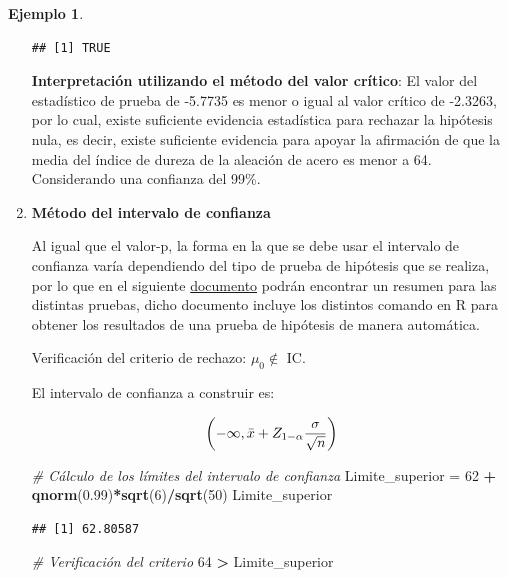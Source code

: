 \documentclass[
  11pt,
]{book}
\newenvironment{Shaded}{\begin{snugshade}}{\end{snugshade}}
\newcommand{\CommentTok}[1]{\textcolor[rgb]{0.56,0.35,0.01}{\textit{#1}}}
\newcommand{\DecValTok}[1]{\textcolor[rgb]{0.00,0.00,0.81}{#1}}
\newcommand{\FloatTok}[1]{\textcolor[rgb]{0.00,0.00,0.81}{#1}}
\newcommand{\FunctionTok}[1]{\textcolor[rgb]{0.13,0.29,0.53}{\textbf{#1}}}
\newcommand{\NormalTok}[1]{#1}
\newcommand{\OtherTok}[1]{\textcolor[rgb]{0.56,0.35,0.01}{#1}}
\newcommand{\SpecialCharTok}[1]{\textcolor[rgb]{0.81,0.36,0.00}{\textbf{#1}}}
\theoremstyle{definition}
\theoremstyle{definition}
\newtheorem{example}{Ejemplo}[chapter]
\theoremstyle{definition}
\theoremstyle{definition}
\theoremstyle{remark}
\begin{document}
\begin{example}
\begin{enumerate}
\begin{verbatim}
## [1] TRUE
\end{verbatim}

  \textbf{Interpretación utilizando el método del valor crítico}: El valor del estadístico de prueba de -5.7735 es menor o igual al valor crítico de -2.3263, por lo cual, existe suficiente evidencia estadística para rechazar la hipótesis nula, es decir, existe suficiente evidencia para apoyar la afirmación de que la media del índice de dureza de la aleación de acero es menor a 64. Considerando una confianza del 99\%.
\item
  \textbf{Método del intervalo de confianza}

  Al igual que el valor-p, la forma en la que se debe usar el intervalo de confianza varía dependiendo del tipo de prueba de hipótesis que se realiza, por lo que en el siguiente \href{material/resumenes/hipotesis+ic.pdf}{documento} podrán encontrar un resumen para las distintas pruebas, dicho documento incluye los distintos comando en R para obtener los resultados de una prueba de hipótesis de manera automática.

  Verificación del criterio de rechazo: \(\mu_0 \notin\) IC.

  El intervalo de confianza a construir es:

  \begin{equation}
    \notag
    \left(-\infty, \bar{x} + Z_{1-\alpha}\frac{\sigma}{\sqrt{n}}\right)
  \end{equation}

\begin{Shaded}
\begin{Highlighting}[]
\CommentTok{\# Cálculo de los límites del intervalo de confianza}
\NormalTok{Limite\_superior }\OtherTok{=} \DecValTok{62} \SpecialCharTok{+} \FunctionTok{qnorm}\NormalTok{(}\FloatTok{0.99}\NormalTok{)}\SpecialCharTok{*}\FunctionTok{sqrt}\NormalTok{(}\DecValTok{6}\NormalTok{)}\SpecialCharTok{/}\FunctionTok{sqrt}\NormalTok{(}\DecValTok{50}\NormalTok{)}
\NormalTok{Limite\_superior}
\end{Highlighting}
\end{Shaded}

\begin{verbatim}
## [1] 62.80587
\end{verbatim}

\begin{Shaded}
\begin{Highlighting}[]
\CommentTok{\# Verificación del criterio}
\DecValTok{64} \SpecialCharTok{\textgreater{}}\NormalTok{ Limite\_superior}
\end{Highlighting}
\end{Shaded}


\end{enumerate}
\end{example}
\end{document}
